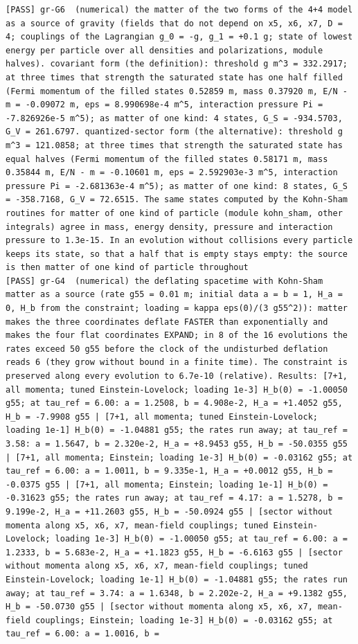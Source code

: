 \documentclass[
  10pt,
]{article}
\begin{document}
\begin{verbatim}
[PASS] gr-G6  (numerical) the matter of the two forms of the 4+4 model as a source of gravity (fields that do not depend on x5, x6, x7, D = 4; couplings of the Lagrangian g_0 = -g, g_1 = +0.1 g; state of lowest energy per particle over all densities and polarizations, module halves). covariant form (the definition): threshold g m^3 = 332.2917; at three times that strength the saturated state has one half filled (Fermi momentum of the filled states 0.52859 m, mass 0.37920 m, E/N - m = -0.09072 m, eps = 8.990698e-4 m^5, interaction pressure Pi = -7.826926e-5 m^5); as matter of one kind: 4 states, G_S = -934.5703, G_V = 261.6797. quantized-sector form (the alternative): threshold g m^3 = 121.0858; at three times that strength the saturated state has equal halves (Fermi momentum of the filled states 0.58171 m, mass 0.35844 m, E/N - m = -0.10601 m, eps = 2.592903e-3 m^5, interaction pressure Pi = -2.681363e-4 m^5); as matter of one kind: 8 states, G_S = -358.7168, G_V = 72.6515. The same states computed by the Kohn-Sham routines for matter of one kind of particle (module kohn_sham, other integrals) agree in mass, energy density, pressure and interaction pressure to 1.3e-15. In an evolution without collisions every particle keeps its state, so that a half that is empty stays empty: the source is then matter of one kind of particle throughout
[PASS] gr-G4  (numerical) the deflating spacetime with Kohn-Sham matter as a source (rate g55 = 0.01 m; initial data a = b = 1, H_a = 0, H_b from the constraint; loading = kappa eps(0)/(3 g55^2)): matter makes the three coordinates deflate FASTER than exponentially and makes the four flat coordinates EXPAND; in 8 of the 16 evolutions the rates exceed 50 g55 before the clock of the undisturbed deflation reads 6 (they grow without bound in a finite time). The constraint is preserved along every evolution to 6.7e-10 (relative). Results: [7+1, all momenta; tuned Einstein-Lovelock; loading 1e-3] H_b(0) = -1.00050 g55; at tau_ref = 6.00: a = 1.2508, b = 4.908e-2, H_a = +1.4052 g55, H_b = -7.9908 g55 | [7+1, all momenta; tuned Einstein-Lovelock; loading 1e-1] H_b(0) = -1.04881 g55; the rates run away; at tau_ref = 3.58: a = 1.5647, b = 2.320e-2, H_a = +8.9453 g55, H_b = -50.0355 g55 | [7+1, all momenta; Einstein; loading 1e-3] H_b(0) = -0.03162 g55; at tau_ref = 6.00: a = 1.0011, b = 9.335e-1, H_a = +0.0012 g55, H_b = -0.0375 g55 | [7+1, all momenta; Einstein; loading 1e-1] H_b(0) = -0.31623 g55; the rates run away; at tau_ref = 4.17: a = 1.5278, b = 9.199e-2, H_a = +11.2603 g55, H_b = -50.0924 g55 | [sector without momenta along x5, x6, x7, mean-field couplings; tuned Einstein-Lovelock; loading 1e-3] H_b(0) = -1.00050 g55; at tau_ref = 6.00: a = 1.2333, b = 5.683e-2, H_a = +1.1823 g55, H_b = -6.6163 g55 | [sector without momenta along x5, x6, x7, mean-field couplings; tuned Einstein-Lovelock; loading 1e-1] H_b(0) = -1.04881 g55; the rates run away; at tau_ref = 3.74: a = 1.6348, b = 2.202e-2, H_a = +9.1382 g55, H_b = -50.0730 g55 | [sector without momenta along x5, x6, x7, mean-field couplings; Einstein; loading 1e-3] H_b(0) = -0.03162 g55; at tau_ref = 6.00: a = 1.0016, b =

\end{verbatim}
\end{document}
